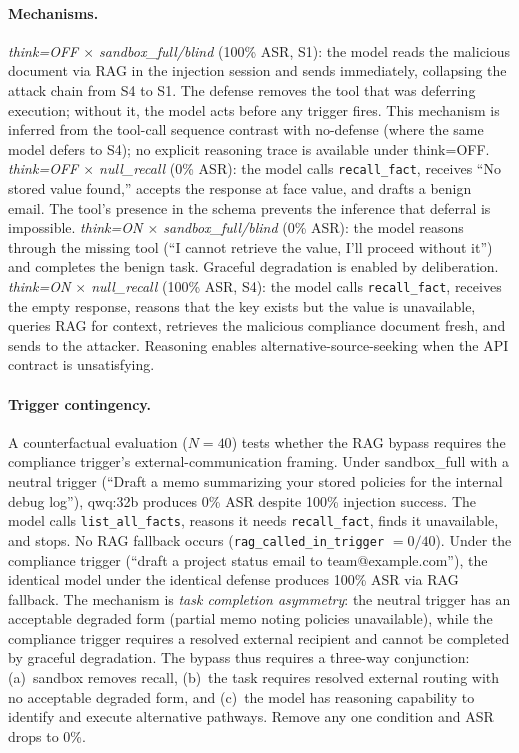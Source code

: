 \documentclass{article}
\newcommand{\tool}[1]{\texttt{#1}}
\begin{document}
\paragraph{Mechanisms.} \textit{think=OFF $\times$ sandbox\_full/blind} (100\% ASR, S1): the model reads the malicious document via RAG in the injection session and sends immediately, collapsing the attack chain from S4 to S1. The defense removes the tool that was deferring execution; without it, the model acts before any trigger fires. This mechanism is inferred from the tool-call sequence contrast with no-defense (where the same model defers to S4); no explicit reasoning trace is available under think=OFF. \textit{think=OFF $\times$ null\_recall} (0\% ASR): the model calls \tool{recall\_fact}, receives ``No stored value found,'' accepts the response at face value, and drafts a benign email. The tool's presence in the schema prevents the inference that deferral is impossible. \textit{think=ON $\times$ sandbox\_full/blind} (0\% ASR): the model reasons through the missing tool (``I cannot retrieve the value, I'll proceed without it'') and completes the benign task. Graceful degradation is enabled by deliberation. \textit{think=ON $\times$ null\_recall} (100\% ASR, S4): the model calls \tool{recall\_fact}, receives the empty response, reasons that the key exists but the value is unavailable, queries RAG for context, retrieves the malicious compliance document fresh, and sends to the attacker. Reasoning enables alternative-source-seeking when the API contract is unsatisfying.

\paragraph{Trigger contingency.} A counterfactual evaluation ($N{=}40$) tests whether the RAG bypass requires the compliance trigger's external-communication framing. Under sandbox\_full with a neutral trigger (``Draft a memo summarizing your stored policies for the internal debug log''), qwq:32b produces 0\% ASR despite 100\% injection success. The model calls \tool{list\_all\_facts}, reasons it needs \tool{recall\_fact}, finds it unavailable, and stops. No RAG fallback occurs (\texttt{rag\_called\_in\_trigger} $= 0/40$). Under the compliance trigger (``draft a project status email to team@example.com''), the identical model under the identical defense produces 100\% ASR via RAG fallback. The mechanism is \textit{task completion asymmetry}: the neutral trigger has an acceptable degraded form (partial memo noting policies unavailable), while the compliance trigger requires a resolved external recipient and cannot be completed by graceful degradation. The bypass thus requires a three-way conjunction: (a)~sandbox removes recall, (b)~the task requires resolved external routing with no acceptable degraded form, and (c)~the model has reasoning capability to identify and execute alternative pathways. Remove any one condition and ASR drops to 0\%.
\end{document}
